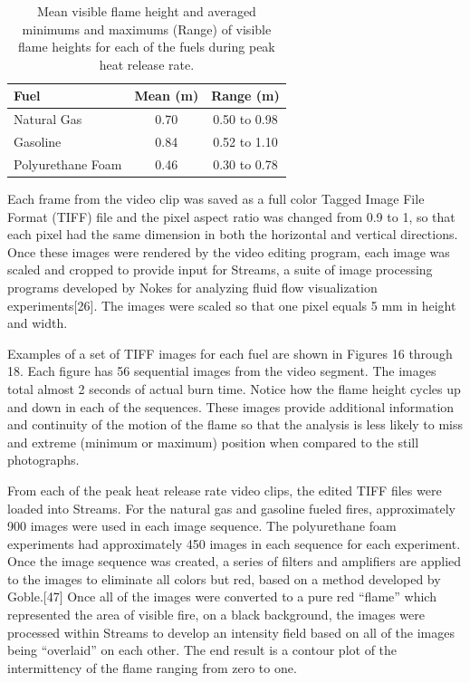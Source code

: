 \documentclass[twoside]{uocthesis}
\begin{document}
{\begin{table}
  \centering
  \begin{tabular}{|l|c|c|}
     \hline
     Fuel	            & Mean (m)  & Range (m) \\ \hline
     Natural Gas	    & 0.70	    & 0.50 to 0.98 \\
     Gasoline 	        & 0.84	    & 0.52 to 1.10 \\
     Polyurethane Foam  & 0.46	    & 0.30 to 0.78 \\
     \hline
   \end{tabular}
  \caption[Mean visible flame height and averaged minimums and maximums]{Mean visible flame height and averaged minimums and maximums (Range) of visible flame heights for each of the fuels during peak heat release rate.}
  \label{Flame_Heights}
\end{table}
  
Each frame from the video clip was saved as a full color Tagged Image File Format (TIFF) file and the pixel aspect ratio was changed from 0.9 to 1, so that each pixel had the same dimension in both the horizontal and vertical directions.  Once these images were rendered by the video editing program, each image was scaled and cropped to provide input for Streams, a suite of image processing programs developed by Nokes for analyzing fluid flow visualization experiments[26]. The images were scaled so that one pixel equals 5 mm in height and width. 

Examples of a set of TIFF images for each fuel are shown in Figures 16 through 18.   Each figure has 56 sequential images from the video segment.  The images total almost 2 seconds of actual burn time.  Notice how the flame height cycles up and down in each of the sequences.  These images provide additional information and continuity of the motion of the flame so that the analysis is less likely to miss and extreme (minimum or maximum) position when compared to the still photographs. 
 
From each of the peak heat release rate video clips, the edited TIFF files were loaded into Streams.  For the natural gas and gasoline fueled fires, approximately 900 images were used in each image sequence.  The polyurethane foam experiments had approximately 450 images in each sequence for each experiment.  Once the image sequence was created, a series of filters and amplifiers are applied to the images to eliminate all colors but red, based on a method developed by Goble.[47]  Once all of the images were converted to a pure red “flame” which represented the area of visible fire, on a black background, the images were processed within Streams to develop an intensity field based on all of the images being “overlaid” on each other.  The end result is a contour plot of the intermittency of the flame ranging from zero to one.
  
}
\end{document}
